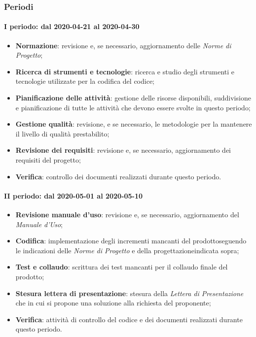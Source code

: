 \subsubsection{Periodi}
\paragraph*{I periodo: dal 2020-04-21 al 2020-04-30}
\begin{itemize}
	\item \textbf{Normazione}: revisione e, se necessario, aggiornamento delle \textit{Norme di Progetto};
	\item \textbf{Ricerca di strumenti e tecnologie}: ricerca e studio degli strumenti e tecnologie utilizzate per la codifica del codice;
	\item \textbf{Pianificazione delle attività}: gestione delle risorse disponibili, suddivisione e pianificazione di tutte le attività che devono essere svolte in questo periodo;
	\item \textbf{Gestione qualità}: revisione, e se necessario, le metodologie per la mantenere il livello di qualità prestabilito;
	\item \textbf{Revisione dei requisiti}: revisione e, se necessario, aggiornamento dei requisiti del progetto\glo;
	\item \textbf{Verifica}: controllo dei documenti realizzati durante questo periodo.
\end{itemize}

\paragraph*{II periodo: dal 2020-05-01 al 2020-05-10}
\begin{itemize}
	\item \textbf{Revisione manuale d'uso}: revisione e, se necessario, aggiornamento del \textit{Manuale d'Uso};
	\item \textbf{Codifica}: implementazione degli incrementi mancanti del prodotto\glosp seguendo le indicazioni delle \textit{Norme di Progetto} e della progettazione\glosp indicata sopra;
	\item \textbf{Test e collaudo}: scrittura dei test mancanti per il collaudo finale del prodotto\glo;
	\item \textbf{Stesura lettera di presentazione}: stesura della \textit{Lettera di Presentazione} che in cui si propone una soluzione alla richiesta del proponente;
	\item \textbf{Verifica}: attività di controllo del codice e dei documenti realizzati durante questo periodo.
\end{itemize}

